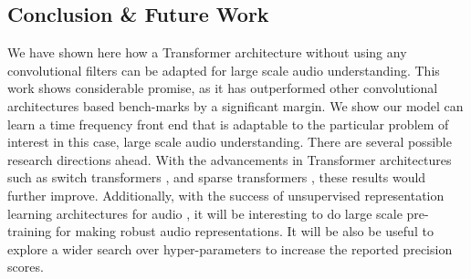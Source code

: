 \documentclass{article}
\begin{document}
\begin{sloppy}
\section{Conclusion \& Future Work}
\label{sec:conclusion}
We have shown here how a Transformer architecture without using any convolutional filters can be adapted for large scale audio understanding. This work shows considerable promise, as it has outperformed other convolutional architectures based bench-marks by a significant margin. We show our model can learn a time frequency front end that is adaptable to the particular problem of interest in this case, large scale audio understanding.  
There are several possible research directions ahead. With the advancements in Transformer architectures such as switch transformers \cite{fedus_zoph_shazeer_2021}, and sparse transformers \cite{child2019generating}, these results would further improve. Additionally, with the success of unsupervised representation learning architectures for audio \cite{verma2020framework}, it will be interesting to do large scale pre-training for making robust audio representations. It will be also be useful to explore a wider search over hyper-parameters to increase the reported precision scores. 




%
% 
%
%
%
% 
%
% 
% 


\end{sloppy}
\end{document}
